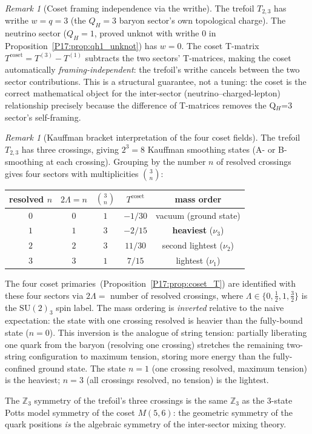 \documentclass[11pt,a4paper]{article}
\theoremstyle{definition}\newtheorem{definition}[theorem]{Definition}
\theoremstyle{remark}
\newtheorem{remark}[theorem]{Remark}
\newcommand{\SU}{\mathrm{SU}}
\newcommand{\QH}{Q_H}
\begin{document}
\begin{remark}[Coset framing independence via the writhe]
\label{P17:rem:framing}
The trefoil $T_{2,3}$ has writhe $w=q=3$ (the $\QH=3$ baryon sector's
own topological charge).  The neutrino sector ($\QH=1$, proved unknot
with writhe $0$ in Proposition~\ref{P17:prop:qh1_unknot}) has $w=0$.  The
coset T-matrix $T^{\mathrm{coset}}=T^{(3)}-T^{(1)}$ subtracts the
two sectors' T-matrices, making the coset automatically \emph{framing-independent}: the trefoil's writhe cancels between the
two sector contributions.  This is a structural guarantee, not a
tuning: the coset is the correct mathematical object for the
inter-sector (neutrino--charged-lepton) relationship precisely
because the difference of T-matrices removes the Q$_H$=3 sector's
self-framing.
\end{remark}

\begin{remark}[Kauffman bracket interpretation of the four coset fields]
\label{P17:rem:kauffman}
The trefoil $T_{2,3}$ has three crossings, giving $2^3=8$ Kauffman
smoothing states (A- or B-smoothing at each crossing).  Grouping by
the number $n$ of resolved crossings gives four sectors with
multiplicities $\binom{3}{n}$:
\begin{center}
\renewcommand{\arraystretch}{1.3}
\begin{tabular}{ccccc}
\toprule
resolved $n$ & $2\Lambda=n$ & $\binom{3}{n}$ & $T^{\mathrm{coset}}$
  & mass order \\
\midrule
$0$ & $0$  & $1$ & $-1/30$  & vacuum (ground state) \\
$1$ & $1$  & $3$ & $-2/15$  & \textbf{heaviest} ($\nu_3$) \\
$2$ & $2$  & $3$ & $11/30$  & second lightest ($\nu_2$) \\
$3$ & $3$  & $1$ & $7/15$   & lightest ($\nu_1$) \\
\bottomrule
\end{tabular}
\end{center}
The four coset primaries~(Proposition~\ref{P17:prop:coset_T}) are
identified with these four sectors via $2\Lambda=$ number of
resolved crossings, where $\Lambda\in\{0,\tfrac12,1,\tfrac32\}$
is the $\SU(2)_3$ spin label.  The mass ordering is \emph{inverted}
relative to the naive expectation: the state with one crossing
resolved is heavier than the fully-bound state ($n=0$).  This
inversion is the analogue of string tension: partially liberating
one quark from the baryon (resolving one crossing) stretches the
remaining two-string configuration to maximum tension, storing
more energy than the fully-confined ground state.  The state $n=1$
(one crossing resolved, maximum tension) is the heaviest; $n=3$
(all crossings resolved, no tension) is the lightest.

The $\mathbb{Z}_3$ symmetry of the trefoil's three crossings is the
same $\mathbb{Z}_3$ as the 3-state Potts model symmetry of the coset
$M(5,6)$: the geometric symmetry of the quark positions \emph{is}
the algebraic symmetry of the inter-sector mixing theory.
\end{remark}
\end{document}
